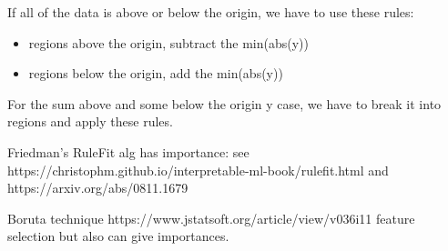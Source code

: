 \documentclass[12pt]{article}
\begin{document}
If all of the data is above or below the origin, we have to use these rules:

\begin{itemize}
\item regions above the origin, subtract the min(abs(y))
\item regions below the origin, add the min(abs(y))
\end{itemize}

For the sum above and some below the origin y case, we have to break it into regions and apply these rules.

Friedman's RuleFit alg has importance: see https://christophm.github.io/interpretable-ml-book/rulefit.html and https://arxiv.org/abs/0811.1679

Boruta technique https://www.jstatsoft.org/article/view/v036i11 feature selection but also can give importances.




\end{document}
